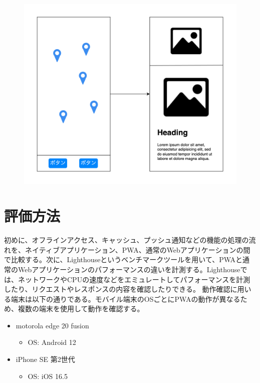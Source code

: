 \begin{multicols*}{2}
\begin{figure}
  \centering
  \includegraphics[width=\linewidth]{fig/screen_transition_diagram.png}
  \label{figure1}
\end{figure}

\section{評価方法}
初めに、オフラインアクセス、キャッシュ、プッシュ通知などの機能の処理の流れを、ネイティブアプリケーション、PWA、通常のWebアプリケーションの間で比較する。次に、Lighthouse\cite{Lighthouse}というベンチマークツールを用いて、PWAと通常のWebアプリケーションのパフォーマンスの違いを計測する。Lighthouseでは、ネットワークやCPUの速度などをエミュレートしてパフォーマンスを計測したり、リクエストやレスポンスの内容を確認したりできる。
動作確認に用いる端末は以下の通りである。モバイル端末のOSごとにPWAの動作が異なるため、複数の端末を使用して動作を確認する。

\begin{itemize}
  \item motorola edge 20 fusion
    \begin{itemize}
      \item OS: Android 12
    \end{itemize}
  \item iPhone SE 第2世代
    \begin{itemize}
      \item OS: iOS 16.5
    \end{itemize}
\end{itemize}


\end{multicols*}
